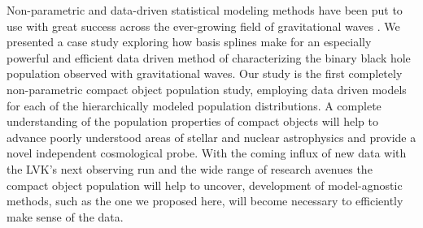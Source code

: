 Non-parametric and data-driven statistical modeling methods have been put to use with great success across the ever-growing field of gravitational 
waves \citep{B_Farr_etal_2014,Littenberg_2015,Mandel_2016,Edwards_2018,Doctor_GPR,Edelman_2021,Vitale_2021,Tiwari_2021_a,Tiwari_2021_b,Edelman_2022ApJ,Tiwari_2022ApJ}. 
We presented a case study exploring how basis splines make for an especially powerful and efficient data driven method of characterizing the binary black hole population observed 
with gravitational waves. Our study is the first completely non-parametric compact object population study, employing data driven models for each of the hierarchically 
modeled population distributions. A complete understanding of the population properties of compact objects will help to advance poorly understood areas of stellar and 
nuclear astrophysics and provide a novel independent cosmological probe. With the coming influx of new data with the LVK's next observing run and the wide 
range of research avenues the compact object population will help to uncover, development of model-agnostic methods, such as the one we proposed here, will become necessary to efficiently make
sense of the data.